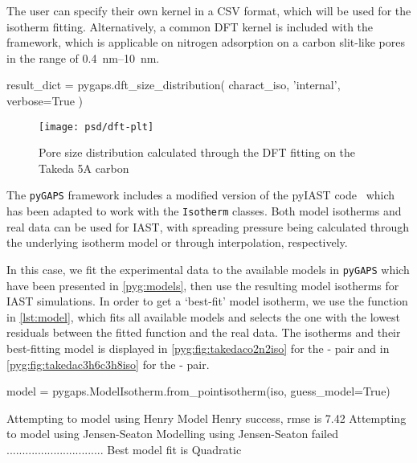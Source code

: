 The user can specify their own kernel in a CSV format, which will be
used for the isotherm fitting. Alternatively, a common DFT 
kernel is included with the framework, which is applicable on
nitrogen adsorption on a carbon slit-like pores in the range of
\SIrange{0.4}{10}{\nano\meter}.

\begin{python}[caption={DFT size distribution in pyGAPS},%
    label={pyg:lst:dft}]
result_dict = pygaps.dft_size_distribution(
    charact_iso,
    'internal',
    verbose=True
)
\end{python}
\begin{figure}[!htb]
	\texttt{[image: psd/dft-plt]}
	\caption{Pore size distribution calculated through the DFT fitting on the Takeda 5A carbon}%
	\label{fig:pyg:fig:dft}
\end{figure}



The \texttt{pyGAPS} framework includes a modified version of 
the pyIAST code~\cite{simonPyIASTIdealAdsorbed2016} which has 
been adapted to work with the \texttt{Isotherm} 
classes. Both model isotherms and real data can be used for 
IAST, with spreading pressure being calculated through the 
underlying isotherm model or through interpolation, respectively. 

In this case, we fit the experimental data to the available models 
in \texttt{pyGAPS} which have been presented in \autoref{pyg:models},
then use the resulting model isotherms for IAST simulations. 
In order to get a `best-fit' model isotherm,
we use the function in \autoref{lst:model},
which fits all available models and selects the one with the lowest 
residuals between the fitted function and the real data.
The isotherms and their best-fitting model is displayed in 
\autoref{pyg:fig:takedaco2n2iso} for the - pair and 
in \autoref{pyg:fig:takedac3h6c3h8iso} for the - pair.

\begin{python}[caption={Guessing the best model},label={lst:model}]
model = pygaps.ModelIsotherm.from_pointisotherm(iso, guess_model=True)
\end{python}
\begin{pythonout}
Attempting to model using Henry
Model Henry success, rmse is 7.42
Attempting to model using Jensen-Seaton
Modelling using Jensen-Seaton failed
...............................
Best model fit is Quadratic
\end{pythonout}

